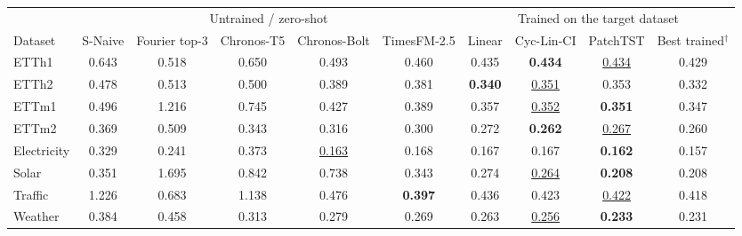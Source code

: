 \begin{tabular}{lccccccccc}
\toprule
& \multicolumn{5}{c}{Untrained / zero-shot} & \multicolumn{4}{c}{Trained on the target dataset} \\
\cmidrule(lr){2-6}\cmidrule(lr){7-10}
Dataset & S-Naive & Fourier top-3 & Chronos-T5 & Chronos-Bolt & TimesFM-2.5 & Linear & Cyc-Lin-CI & PatchTST & Best trained$^\dagger$ \\
\midrule
ETTh1 & 0.643 & 0.518 & 0.650 & 0.493 & 0.460 & 0.435 & \textbf{0.434} & \underline{0.434} & 0.429 \\
ETTh2 & 0.478 & 0.513 & 0.500 & 0.389 & 0.381 & \textbf{0.340} & \underline{0.351} & 0.353 & 0.332 \\
ETTm1 & 0.496 & 1.216 & 0.745 & 0.427 & 0.389 & 0.357 & \underline{0.352} & \textbf{0.351} & 0.347 \\
ETTm2 & 0.369 & 0.509 & 0.343 & 0.316 & 0.300 & 0.272 & \textbf{0.262} & \underline{0.267} & 0.260 \\
Electricity & 0.329 & 0.241 & 0.373 & \underline{0.163} & 0.168 & 0.167 & 0.167 & \textbf{0.162} & 0.157 \\
Solar & 0.351 & 1.695 & 0.842 & 0.738 & 0.343 & 0.274 & \underline{0.264} & \textbf{0.208} & 0.208 \\
Traffic & 1.226 & 0.683 & 1.138 & 0.476 & \textbf{0.397} & 0.436 & 0.423 & \underline{0.422} & 0.418 \\
Weather & 0.384 & 0.458 & 0.313 & 0.279 & 0.269 & 0.263 & \underline{0.256} & \textbf{0.233} & 0.231 \\
\bottomrule
\end{tabular}
